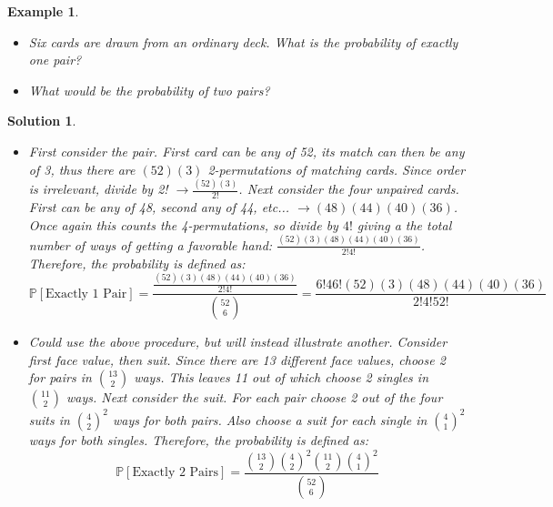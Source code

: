 \documentclass[12pt, letterpaper, onecolumn, conference, final]{IEEEtran}
\theoremstyle{definition}
\theoremstyle{plain}
\newtheorem{example}{Example}[section]
\newtheorem{solution}{Solution}[section]
\begin{document}
\newpage
\begin{example}
\hfill
\begin{itemize}

\item[(a)]
Six cards are drawn from an ordinary deck. What is the probability of exactly one pair?

\vspace{.2cm}
\item[(b)]
What would be the probability of two pairs?

\end{itemize}
\end{example}
\begin{solution}
\hfill
\begin{itemize}

\item[(a)]
First consider the pair. First card can be any of 52, its match can then be any of 3, thus there are $(52)(3)$ 2-permutations of matching cards. Since order is irrelevant, divide by 2! $\rightarrow \frac{(52)(3)}{2!}$. Next consider the four unpaired cards. First can be any of 48, second any of 44, etc... $\rightarrow (48)(44)(40)(36)$. Once again this counts the 4-permutations, so divide by $4!$ giving a the total number of ways of getting a favorable hand: $\frac{(52)(3)(48)(44)(40)(36)}{2!4!}$. Therefore, the probability is defined as:
\begin{equation*}
\mathbb{P}[\text{Exactly 1 Pair}] = \frac{\frac{(52)(3)(48)(44)(40)(36)}{2!4!}}{{52 \choose 6}} = \frac{6!46!(52)(3)(48)(44)(40)(36)}{2!4!52!}
\end{equation*}

\vspace{.2cm}
\item[(b)]
Could use the above procedure, but will instead illustrate another. Consider first face value, then suit. Since there are 13 different face values, choose 2 for pairs in ${13 \choose 2}$ ways. This leaves 11 out of which choose 2 singles in ${11 \choose 2}$ ways. Next consider the suit. For each pair choose 2 out of the four suits in ${4 \choose 2}^2$ ways for both pairs. Also choose a suit for each single in ${4 \choose 1}^2$ ways for both singles. Therefore, the probability is defined as:
\begin{equation*}
\mathbb{P}[\text{Exactly 2 Pairs}] = \frac{{13 \choose 2}{4 \choose 2}^2 {11 \choose 2}{4 \choose 1}^2}{{52 \choose 6}}
\end{equation*}

\end{itemize}
\end{solution}
\end{document}
